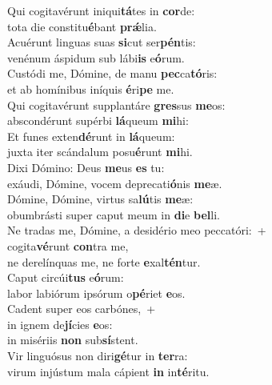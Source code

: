 \evenverse Qui cogitavérunt iniqui\textbf{tá}tes in \textbf{cor}de:~\*\\
\evenverse tota die constitu\textbf{é}bant \textbf{prǽ}lia.\\
\oddverse Acuérunt linguas suas \textbf{si}cut ser\textbf{pén}tis:~\*\\
\oddverse venénum áspidum sub lábi\textbf{is} e\textbf{ó}rum.\\
\evenverse Custódi me, Dómine, de manu \textbf{pec}ca\textbf{tó}ris:~\*\\
\evenverse et ab homínibus iníquis \textbf{é}ri\textbf{pe} me.\\
\oddverse Qui cogitavérunt supplantáre \textbf{gres}sus \textbf{me}os:~\*\\
\oddverse abscondérunt supérbi \textbf{lá}queum \textbf{mi}hi:\\
\evenverse Et funes exten\textbf{dé}runt in \textbf{lá}queum:~\*\\
\evenverse juxta iter scándalum posu\textbf{é}runt \textbf{mi}hi.\\
\oddverse Dixi Dómino: Deus \textbf{me}us \textbf{es} tu:~\*\\
\oddverse exáudi, Dómine, vocem deprecati\textbf{ó}nis \textbf{me}æ.\\
\evenverse Dómine, Dómine, virtus sa\textbf{lú}tis \textbf{me}æ:~\*\\
\evenverse obumbrásti super caput meum in \textbf{di}e \textbf{bel}li.\\
\oddverse Ne tradas me, Dómine, a desidério meo peccatóri:~+\\
\oddverse  cogita\textbf{vé}runt \textbf{con}tra me,~\*\\
\oddverse ne derelínquas me, ne forte \textbf{e}xal\textbf{tén}tur.\\
\evenverse Caput circúi\textbf{tus} e\textbf{ó}rum:~\*\\
\evenverse labor labiórum ipsórum o\textbf{pé}riet \textbf{e}os.\\
\oddverse Cadent super eos carbónes,~+\\
\oddverse  in ignem de\textbf{jí}cies \textbf{e}os:~\*\\
\oddverse in misériis \textbf{non} sub\textbf{sí}stent.\\
\evenverse Vir linguósus non diri\textbf{gé}tur in \textbf{ter}ra:~\*\\
\evenverse virum injústum mala cápient \textbf{in} in\textbf{té}ritu.\\
